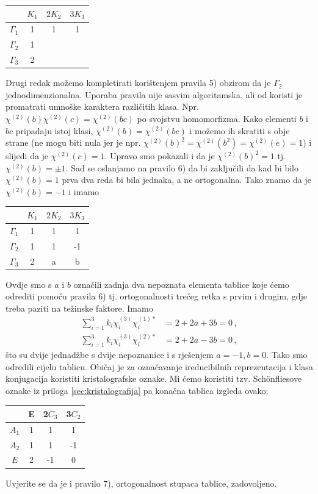 \begin{primjer}
\begin{center}
\begin{tabular}{c|ccc}
  & $K_1$ & $2 K_2$  & $ 3 K_3$ \\ \hline
$\Gamma_1$ & 1 & 1 & 1   \\
$\Gamma_2$ & 1 &  &   \\
 $\Gamma_3$  & 2 &  &  
\end{tabular}
\end{center}
Drugi redak možemo kompletirati korištenjem pravila 5) obzirom da je $\Gamma_2$
jednodimenzionalna. Uporaba pravila nije sasvim algoritamska, ali od koristi je promatrati
umnoške karaktera različitih klasa. Npr. $\chi^{(2)}(b)\chi^{(2)}(c)=\chi^{(2)}(bc)$
po svojstvu homomorfizma. Kako elementi $b$ i $bc$ pripadaju istoj klasi,
$\chi^{(2)}(b)=\chi^{(2)}(bc)$
i možemo ih skratiti s obje strane (ne mogu biti nula jer je npr. 
$\chi^{(2)}(b)^2 = \chi^{(2)}(b^2) =
\chi^{(2)}(e) = 1$) i slijedi da je $\chi^{(2)}(c)=1$. Upravo smo pokazali i da je 
  $\chi^{(2)}(b)^2=1$ tj. $\chi^{(2)}(b)=\pm 1$.
Sad se oslanjamo na pravilo 6) da bi zaključili da kad bi bilo 
$\chi^{(2)}(b)=1$ prva dva reda bi bila jednaka, a ne
ortogonalna. Tako znamo da je $ \chi^{(2)}(b)=-1$ i imamo
\begin{center}
\begin{tabular}{c|ccc}
  & $K_1$ & $2 K_2$  & $ 3 K_3$ \\ \hline
$\Gamma_1$ & 1 & 1 & 1   \\
$\Gamma_2$ & 1 & 1 & -1   \\
 $\Gamma_3$  & 2 & a  & b  
\end{tabular}
\end{center}
Ovdje smo s $a$ i $b$ označili zadnja dva nepoznata elementa tablice koje ćemo
odrediti pomoću pravila 6) tj. ortogonalnosti trećeg retka s prvim i drugim,
gdje treba paziti na težinske faktore. Imamo
\begin{align*}
    \sum_{i=1}^{3} k_{i} \chi^{(3)}_{i} \chi^{(1) *}_{i}& =
      2+2a+3b=0 \,, \\
    \sum_{i=1}^{3} k_{i} \chi^{(3)}_{i} \chi^{(2) *}_{i}& =
      2+2a-3b=0  \,,
\end{align*}
što su dvije jednadžbe s dvije nepoznanice i s rješenjem $a=-1, b=0$.
Tako smo odredili cijelu tablicu. Običaj je za označavanje ireducibilnih
reprezentacija i klasa konjugacija koristiti kristalografske
oznake. Mi ćemo koristiti tzv. Sch\"{o}nfliesove oznake iz priloga \ref{sec:kristalografija} 
 
pa konačna tablica izgleda ovako:
\begin{center}
\begin{tabular}{c|ccc}
  & E & 2$C_3$  & 3$C_2$ \\ \hline
$A_1$ & 1 & 1& 1 \\
$A_2$ & 1 & 1&-1 \\
 $E$  & 2 &-1& 0
\end{tabular}
\end{center}
Uvjerite se da je i pravilo 7), ortogonalnost stupaca tablice, zadovoljeno.
\end{primjer}

